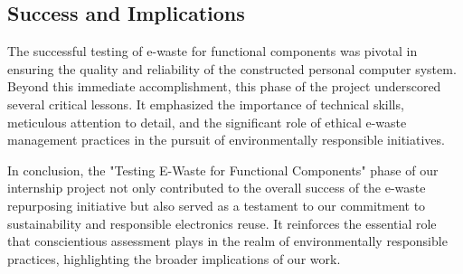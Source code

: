 \subsection{Success and Implications}

The successful testing of e-waste for functional components was pivotal in ensuring the quality and reliability of the constructed personal computer system. Beyond this immediate accomplishment, this phase of the project underscored several critical lessons. It emphasized the importance of technical skills, meticulous attention to detail, and the significant role of ethical e-waste management practices in the pursuit of environmentally responsible initiatives.

In conclusion, the "Testing E-Waste for Functional Components" phase of our internship project not only contributed to the overall success of the e-waste repurposing initiative but also served as a testament to our commitment to sustainability and responsible electronics reuse. It reinforces the essential role that conscientious assessment plays in the realm of environmentally responsible practices, highlighting the broader implications of our work.

